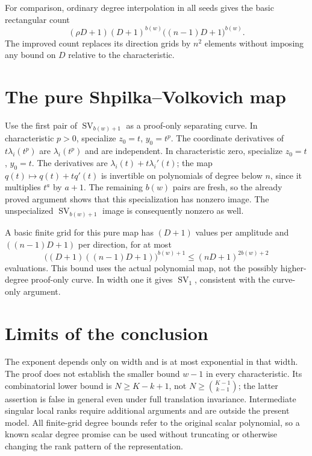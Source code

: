 \documentclass[11pt]{article}
\newcommand{\SV}{\operatorname{SV}}
\begin{document}
For comparison, ordinary degree interpolation in all seeds gives the
basic rectangular count
\[
 (\rho D+1)(D+1)^{b(w)}\bigl((n-1)D+1\bigr)^{b(w)}.
\]
The improved count replaces its direction grids by $n^2$ elements
without imposing any bound on $D$ relative to the characteristic.

\section{The pure Shpilka--Volkovich map}

Use the first pair of $\SV_{b(w)+1}$ as a proof-only separating
curve. In characteristic $p>0$, specialize
$z_0=t$, $y_0=t^p$. The coordinate derivatives of
$t\lambda_i(t^p)$ are $\lambda_i(t^p)$ and are independent.
In characteristic zero, specialize $z_0=t$, $y_0=t$. The derivatives
are $\lambda_i(t)+t\lambda_i'(t)$; the map
$q(t)\mapsto q(t)+tq'(t)$ is invertible on polynomials of degree
below $n$, since it multiplies $t^a$ by $a+1$.
The remaining $b(w)$ pairs are fresh, so the already proved argument
shows that this specialization has nonzero image. The unspecialized
$\SV_{b(w)+1}$ image is consequently nonzero as well.

A basic finite grid for this pure map has $(D+1)$ values per amplitude
and $((n-1)D+1)$ per direction, for at most
\[
 \bigl((D+1)((n-1)D+1)\bigr)^{b(w)+1}
 \le(nD+1)^{2b(w)+2}
\]
evaluations. This bound uses the actual polynomial map, not the
possibly higher-degree proof-only curve. In width one it gives
$\SV_1$, consistent with the curve-only argument.

\section{Limits of the conclusion}

The exponent depends only on width and is at most exponential in that
width. The proof does not establish the smaller bound $w-1$ in every
characteristic. Its combinatorial lower bound is $N\ge K-k+1$,
not $N\ge\binom{K-1}{k-1}$; the latter assertion is false in general
even under full translation invariance. Intermediate singular local
ranks require additional arguments and are outside the present model.
All finite-grid degree bounds refer to the original scalar polynomial,
so a known scalar degree promise can be used without truncating or
otherwise changing the rank pattern of the representation.
\end{document}
